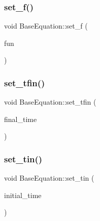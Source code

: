 \subsubsection{\texorpdfstring{set\+\_\+f()}{set\_f()}}
{\footnotesize\ttfamily void Base\+Equation\+::set\+\_\+f (\begin{DoxyParamCaption}\item[{\hyperlink{structEquationFunction}{Equation\+Function} \&}]{fun }\end{DoxyParamCaption})\hspace{0.3cm}{\ttfamily [inline]}}

\mbox{\label{classBaseEquation_a252acc3f65baabe91d21280bd911c745}} 
\subsubsection{\texorpdfstring{set\+\_\+tfin()}{set\_tfin()}}
{\footnotesize\ttfamily void Base\+Equation\+::set\+\_\+tfin (\begin{DoxyParamCaption}\item[{const double \&}]{final\+\_\+time }\end{DoxyParamCaption})\hspace{0.3cm}{\ttfamily [inline]}}

\mbox{\label{classBaseEquation_a483e1f4df9e791cec7f911b5cff0083a}} 
\subsubsection{\texorpdfstring{set\+\_\+tin()}{set\_tin()}}
{\footnotesize\ttfamily void Base\+Equation\+::set\+\_\+tin (\begin{DoxyParamCaption}\item[{const double \&}]{initial\+\_\+time }\end{DoxyParamCaption})\hspace{0.3cm}{\ttfamily [inline]}}

\mbox{\label{classBaseEquation_a07152aa622647f9a2b0e10c5ce330193}} 
